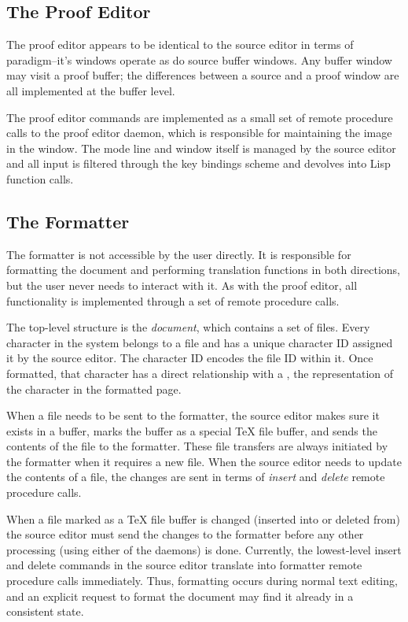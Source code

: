 \subsection{The Proof Editor}

The proof editor appears to be identical to the source editor in terms
of paradigm--it's windows operate as do source buffer windows.  Any
{\VorTeX} buffer window may visit a proof buffer; the differences
between a source and a proof window are all implemented at the buffer
level.

The proof editor commands are implemented as a small set of remote
procedure calls to the proof editor daemon, which is responsible for
maintaining the image in the window.  The mode line and window itself
is managed by the source editor and all input is filtered through the
key bindings scheme and devolves into Lisp function calls.

\subsection{The Formatter}

The formatter is not accessible by the user directly.  It is responsible
for formatting the document and performing translation functions in
both directions, but the user never needs to interact with it.  As with
the proof editor, all functionality is implemented through a set of
remote procedure calls.

The top-level structure is the {\it document\/}, which contains a set
of {files\/}.  Every character in the system belongs to a file and has
a unique character ID assigned it by the source editor.  The character
ID encodes the file ID within it.  Once formatted, that character has
a direct relationship with a \tbox, the representation of the
character in the formatted page.

When a file needs to be sent to the formatter, the source editor makes
sure it exists in a buffer, marks the buffer as a special {\TeX} file
buffer, and sends the contents of the file to the formatter.  These
file transfers are always initiated by the formatter when it requires
a new file.  When the source editor needs to update the contents of a
file, the changes are sent in terms of {\it insert\/} and {\it delete\/}
remote procedure calls.

When a file marked as a {\TeX} file buffer is changed (inserted into
or deleted from) the source editor must send the changes to the
formatter before any other processing (using either of the daemons) is
done.  Currently, the lowest-level insert and delete commands in the
source editor translate into formatter remote procedure calls
immediately.  Thus, formatting occurs during normal text editing, and
an explicit request to format the document may find it already in a
consistent state.
